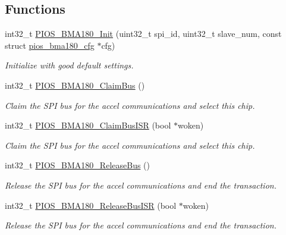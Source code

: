 \subsection*{\-Functions}
\begin{DoxyCompactItemize}
\item 
int32\-\_\-t \hyperlink{group___p_i_o_s___b_m_a180_ga913e423478cf470fc5691ea8d62bca65}{\-P\-I\-O\-S\-\_\-\-B\-M\-A180\-\_\-\-Init} (uint32\-\_\-t spi\-\_\-id, uint32\-\_\-t slave\-\_\-num, const struct \hyperlink{structpios__bma180__cfg}{pios\-\_\-bma180\-\_\-cfg} $\ast$cfg)
\begin{DoxyCompactList}\small\item\em \-Initialize with good default settings. \end{DoxyCompactList}\item 
int32\-\_\-t \hyperlink{group___p_i_o_s___b_m_a180_ga6445f37d7393a3cf869f14425d4f8f60}{\-P\-I\-O\-S\-\_\-\-B\-M\-A180\-\_\-\-Claim\-Bus} ()
\begin{DoxyCompactList}\small\item\em \-Claim the \-S\-P\-I bus for the accel communications and select this chip. \end{DoxyCompactList}\item 
int32\-\_\-t \hyperlink{group___p_i_o_s___b_m_a180_gaa4ed3d63ee77fc3f34b4c307f5552d15}{\-P\-I\-O\-S\-\_\-\-B\-M\-A180\-\_\-\-Claim\-Bus\-I\-S\-R} (bool $\ast$woken)
\begin{DoxyCompactList}\small\item\em \-Claim the \-S\-P\-I bus for the accel communications and select this chip. \end{DoxyCompactList}\item 
int32\-\_\-t \hyperlink{group___p_i_o_s___b_m_a180_ga1027b4d7c9d37660697a5093f7077a42}{\-P\-I\-O\-S\-\_\-\-B\-M\-A180\-\_\-\-Release\-Bus} ()
\begin{DoxyCompactList}\small\item\em \-Release the \-S\-P\-I bus for the accel communications and end the transaction. \end{DoxyCompactList}\item 
int32\-\_\-t \hyperlink{group___p_i_o_s___b_m_a180_gac3df046a46bd9633ccb969436bb8d9ab}{\-P\-I\-O\-S\-\_\-\-B\-M\-A180\-\_\-\-Release\-Bus\-I\-S\-R} (bool $\ast$woken)
\begin{DoxyCompactList}\small\item\em \-Release the \-S\-P\-I bus for the accel communications and end the transaction. \end{DoxyCompactList}\item 

\end{DoxyCompactItemize}

